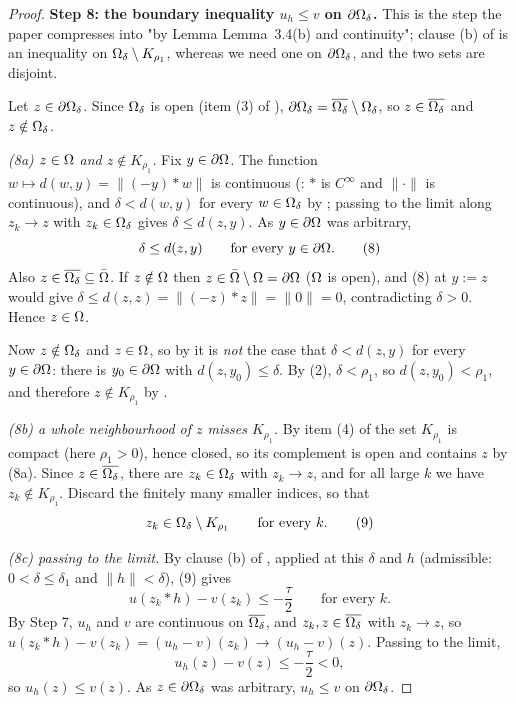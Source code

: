 \begin{proof}
\medskip\noindent\textbf{Step 8: the boundary inequality $u_h\le v$ on $\partial\Omega_\delta$.}
This is the step the paper compresses into "by Lemma Lemma~3.4(b) and continuity"; clause (b)
of  is an inequality on $\Omega_\delta\setminus K_{\rho_1}$, whereas we
need one on $\partial\Omega_\delta$, and the two sets are disjoint.

Let $z\in\partial\Omega_\delta$. Since $\Omega_\delta$ is open (item (3) of
), $\partial\Omega_\delta=\overline{\Omega_\delta}\setminus\Omega_\delta$, so
$z\in\overline{\Omega_\delta}$ and $z\notin\Omega_\delta$.

\emph{(8a) $z\in\Omega$ and $z\notin K_{\rho_1}$.} Fix $y\in\partial\Omega$. The function
$w\mapsto d(w,y)=\|(-y)*w\|$ is continuous (: $*$ is $C^{\infty}$ and
$\|\cdot\|$ is continuous), and $\delta<d(w,y)$ for every $w\in\Omega_\delta$ by
; passing to the limit along $z_k\to z$ with $z_k\in\Omega_\delta$
gives $\delta\le d(z,y)$. As $y\in\partial\Omega$ was arbitrary,
\[
 \delta\le d(z,y)\qquad\text{for every } y\in\partial\Omega . \tag{8}
\]
Also $z\in\overline{\Omega_\delta}\subseteq\bar{\Omega}$. If $z\notin\Omega$ then
$z\in\bar{\Omega}\setminus\Omega=\partial\Omega$ ($\Omega$ is open), and (8) at $y:=z$ would give
$\delta\le d(z,z)=\|(-z)*z\|=\|0\|=0$, contradicting $\delta>0$. Hence $z\in\Omega$.

Now $z\notin\Omega_\delta$ and $z\in\Omega$, so by  it is \emph{not} the
case that $\delta<d(z,y)$ for every $y\in\partial\Omega$: there is $y_0\in\partial\Omega$ with
$d(z,y_0)\le\delta$. By (2), $\delta<\rho_1$, so $d(z,y_0)<\rho_1$, and therefore
$z\notin K_{\rho_1}$ by .

\emph{(8b) a whole neighbourhood of $z$ misses $K_{\rho_1}$.} By item (4) of
 the set $K_{\rho_1}$ is compact (here $\rho_1>0$), hence
closed, so its complement is open and contains $z$ by (8a). Since $z\in\overline{\Omega_\delta}$,
there are $z_k\in\Omega_\delta$ with $z_k\to z$, and for all large $k$ we have
$z_k\notin K_{\rho_1}$. Discard the finitely many smaller indices, so that
\[
 z_k\in\Omega_\delta\setminus K_{\rho_1}\qquad\text{for every } k . \tag{9}
\]

\emph{(8c) passing to the limit.} By clause (b) of , applied at
this $\delta$ and $h$ (admissible: $0<\delta\le\delta_1$ and $\|h\|<\delta$), (9) gives
\[
 u(z_k*h)-v(z_k)\le-\frac\tau2\qquad\text{for every } k .
\]
By Step 7, $u_h$ and $v$ are continuous on $\overline{\Omega_\delta}$, and
$z_k,z\in\overline{\Omega_\delta}$ with $z_k\to z$, so
$u(z_k*h)-v(z_k)=(u_h-v)(z_k)\to(u_h-v)(z)$. Passing to the limit,
\[
 u_h(z)-v(z)\le-\frac\tau2<0 ,
\]
so $u_h(z)\le v(z)$. As $z\in\partial\Omega_\delta$ was arbitrary, $u_h\le v$ on $\partial\Omega_\delta$.


\end{proof}
